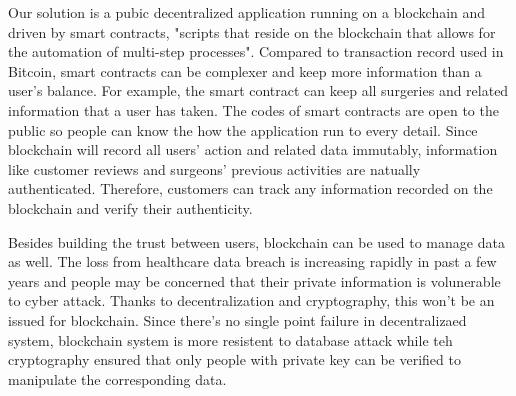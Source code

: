 \documentclass{article}
\begin{document}
\par Our solution is a pubic decentralized application running on a blockchain and driven by smart contracts, "scripts that reside on the blockchain that allows for the automation of multi-step processes"\cite{SmartContract}. Compared to transaction record used in Bitcoin, smart contracts can be complexer and keep more information than a user's balance. For example, the smart contract can keep all surgeries and related information that a user has taken. The codes of smart contracts are open to the public so people can know the how the application run to every detail. Since blockchain will record all users' action and related data immutably, information like customer reviews and surgeons' previous activities are natually authenticated. Therefore, customers can track any information recorded on the blockchain and verify their authenticity. 
\par Besides building the trust between users, blockchain can be used to manage data as well. The loss from healthcare data breach is increasing rapidly in past a few years and people may be concerned that their private information is volunerable to cyber attack\cite{breach}. Thanks to decentralization and cryptography, this won't be an issued for blockchain. Since there's no single point failure in decentralizaed system, blockchain system is more resistent to database attack while teh cryptography ensured that only people with private key can be verified to manipulate the corresponding data.
\end{document}
